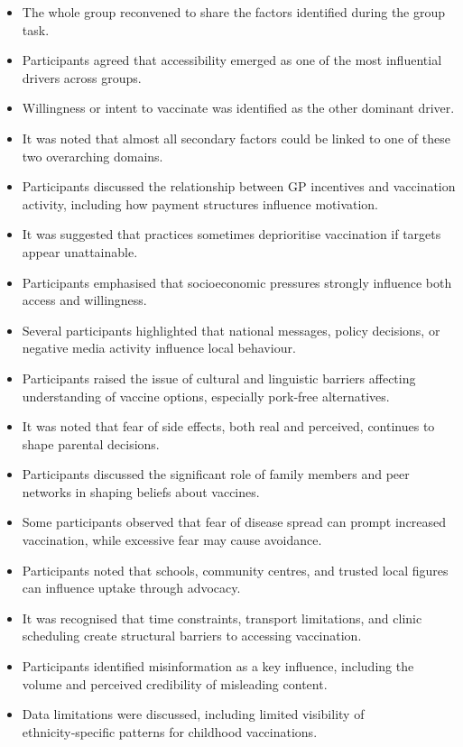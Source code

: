 \documentclass{article}
\begin{document}
\begin{itemize}
    \item The whole group reconvened to share the factors identified during the group task.
    \item Participants agreed that accessibility emerged as one of the most influential drivers across groups.
    \item Willingness or intent to vaccinate was identified as the other dominant driver.
    \item It was noted that almost all secondary factors could be linked to one of these two overarching domains.
    \item Participants discussed the relationship between GP incentives and vaccination activity, including how payment structures influence motivation.
    \item It was suggested that practices sometimes deprioritise vaccination if targets appear unattainable.
    \item Participants emphasised that socioeconomic pressures strongly influence both access and willingness.
    \item Several participants highlighted that national messages, policy decisions, or negative media activity influence local behaviour.
    \item Participants raised the issue of cultural and linguistic barriers affecting understanding of vaccine options, especially pork‑free alternatives.
    \item It was noted that fear of side effects, both real and perceived, continues to shape parental decisions.
    \item Participants discussed the significant role of family members and peer networks in shaping beliefs about vaccines.
    \item Some participants observed that fear of disease spread can prompt increased vaccination, while excessive fear may cause avoidance.
    \item Participants noted that schools, community centres, and trusted local figures can influence uptake through advocacy.
    \item It was recognised that time constraints, transport limitations, and clinic scheduling create structural barriers to accessing vaccination.
    \item Participants identified misinformation as a key influence, including the volume and perceived credibility of misleading content.
    \item Data limitations were discussed, including limited visibility of ethnicity‑specific patterns for childhood vaccinations.

\end{itemize}
\end{document}
